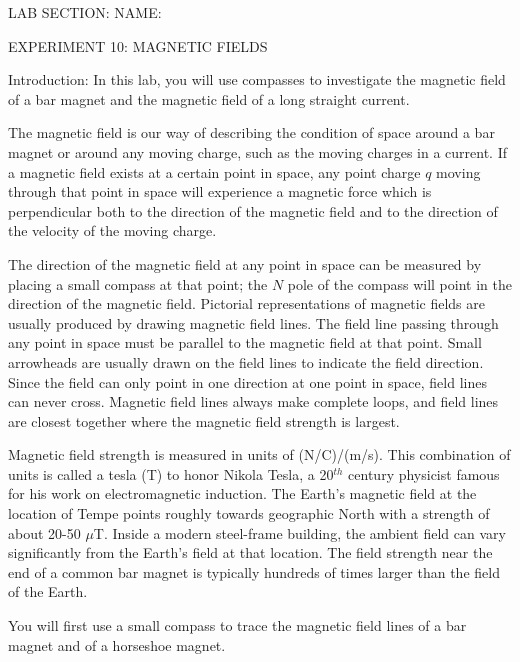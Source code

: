 
\baselineskip=15pt
\vglue-0.7in
\hglue-2.0cm LAB SECTION:
\underbar{~~~~~~~~~~~~~~~~~~~~~~~~~~~~~~~~~~~~~~~~~~~~~~}
 NAME:
\rlap{
\underbar{~~~~~~~~~~~~~~~~~~~~~~~~~~~~~~~~~~~~~~~~~~~~~~}
}
\bigskip
\bigskip
\bigskip
\centerline{EXPERIMENT 10: MAGNETIC FIELDS}
\bigskip
Introduction:  In this lab, you will use compasses to
investigate the magnetic field of a bar magnet
and the magnetic field of a long straight current.

  The magnetic field is our way of describing the condition
of space around a bar magnet or around any moving charge,
such as the moving charges in a current.  If a magnetic field
exists at a certain point in space, any point charge $q$ moving 
through that point in space will experience a magnetic force 
which is perpendicular both to the direction of the magnetic 
field and to the direction of the velocity of the moving charge.

  The direction of the magnetic field at any point in space
can be measured by placing a small compass at that point; the
$N$ pole of the compass will point in the direction of the
magnetic field.  Pictorial representations of magnetic fields
are usually produced by drawing magnetic field lines.  The 
field line passing through any point in space must be parallel 
to the magnetic field at that point.  Small arrowheads are 
usually drawn on the field lines to indicate the field 
direction.  Since the field can only point in one direction at 
one point in space, field lines can never cross.  Magnetic 
field lines always make complete loops, and field lines are 
closest together where the magnetic field strength is largest.  

  Magnetic field strength is measured in units of (N/C)/(m/s).
This combination of units is called a tesla (T) to honor
Nikola Tesla, a 20$^{th}$ century physicist famous for his
work on electromagnetic induction.  The Earth's magnetic field
at the location of Tempe points roughly towards geographic
North with a strength of about 20-50 $\mu$T.  Inside a modern
steel-frame building, the ambient field can vary significantly
from the Earth's field at that location.  The field strength
near the end of a common bar magnet is typically hundreds of
times larger than the field of the Earth.


You will first use a small compass
to trace the magnetic field lines of a bar magnet
and of a horseshoe magnet.
\smallskip
{}   

